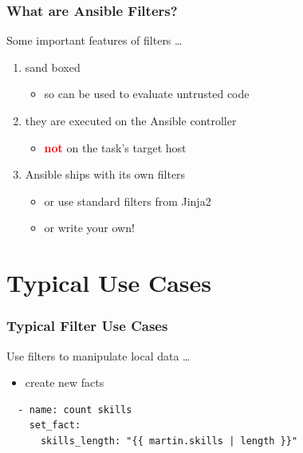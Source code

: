 \documentclass[pdf]{beamer}
\begin{document}
\begin{frame}
  \frametitle{What are Ansible Filters?}
  Some important features of filters \ldots
  \pause{}
  \begin{enumerate}
    \item{sand boxed}
      \pause{}
      \begin{itemize}
        \item{so can be used to evaluate untrusted code}
      \end{itemize}
      \pause{}
    \item{they are executed on the Ansible controller}
      \pause{}
      \begin{itemize}
        \item{\textcolor{red}{\textbf{not}} on the task's target host}
      \end{itemize}
      \pause{}
    \item{Ansible ships with its own filters}
      \pause{}
      \begin{itemize}
        \item{or use standard filters from Jinja2}
          \pause{}
        \item{or write your own!}
      \end{itemize}
  \end{enumerate}
\end{frame}

\section{Typical Use Cases}

\begin{frame}[fragile]
  \frametitle{Typical Filter Use Cases}
  Use filters to manipulate local data \ldots
  \begin{itemize}[<+->]
    \item \alert<1>{create new facts}
  \end{itemize}
  \begin{lstlisting}
  - name: count skills
    set_fact:
      skills_length: "{{ martin.skills | length }}"
  \end{lstlisting}
\end{frame}
\end{document}
